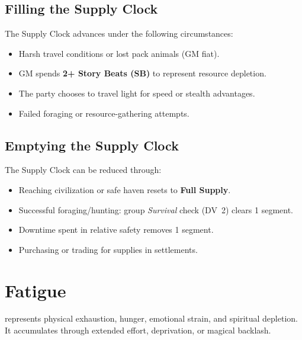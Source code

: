 \subsection{Filling the Supply Clock}
\label{subsec:filling-supply}

The Supply Clock advances under the following circumstances:
\begin{itemize}
\item Harsh travel conditions or lost pack animals (GM fiat). 
\item GM spends \textbf{2+ Story Beats (SB)} to represent resource depletion. 
\item The party chooses to travel light for speed or stealth advantages. 
\item Failed foraging or resource-gathering attempts. 
\end{itemize}

\subsection{Emptying the Supply Clock}
\label{subsec:emptying-supply}

The Supply Clock can be reduced through:
\begin{itemize}
\item Reaching civilization or safe haven resets to \textbf{Full Supply}. 
\item Successful foraging/hunting: group \emph{Survival} check (DV~2) clears 1 segment. 
\item Downtime spent in relative safety removes 1 segment. 
\item Purchasing or trading for supplies in settlements. 
\end{itemize}

\section{Fatigue}
\label{sec:fatigue}

 represents physical exhaustion, hunger, emotional strain, and spiritual depletion. It accumulates through extended effort, deprivation, or magical backlash. 


